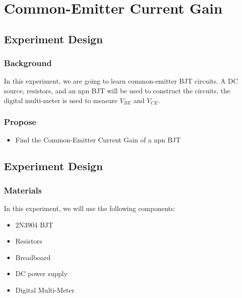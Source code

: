 \section{Common-Emitter Current Gain}

\subsection{Experiment Design}
    \subsubsection{Background}
        In this experiment, we are going to learn common-emitter BJT circuits. A DC source, resistors, and an npn BJT will be used to construct the circuits, the digital multi-meter is used to measure $V_{BE}$ and $V_{CE}$.\par

    \subsubsection{Propose}
    \begin{itemize}
        \item Find the Common-Emitter Current Gain of a npn BJT
    \end{itemize}

\subsection{Experiment Design}
    \subsubsection{Materials}
        In this experiment, we will use the following components:
        \begin{itemize}
            \item 2N3904 BJT
            \item Resistors
            \item Breadboard
            \item DC power supply
            \item Digital Multi-Meter
        \end{itemize}

